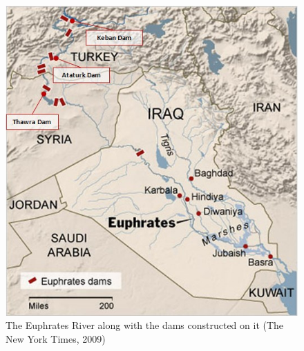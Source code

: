 \documentclass[letterpaper,12pt,titlepage,oneside,final]{book}
\begin{document}
\begin{center}
\begin{figure}[h]
\centering
\includegraphics[scale=.6]{dams.jpg}

\caption{The Euphrates River along with the dams constructed on it (The New York Times, 2009)}

\label{fig:dams}
\end{figure}
\end{center}
\end{document}
